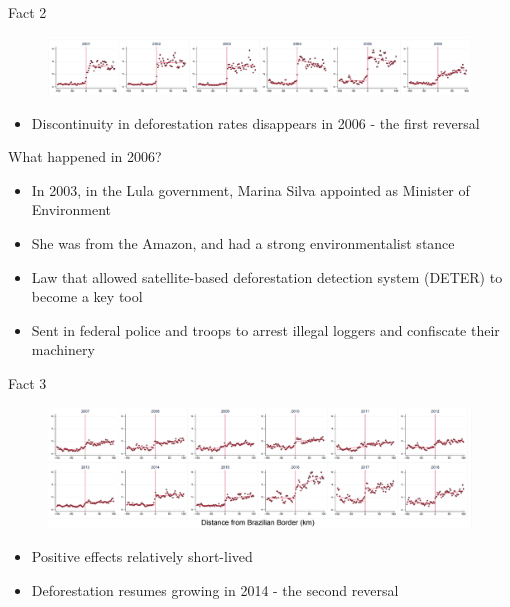 \documentclass[11pt,notes=hide,aspectratio=169,mathserif]{beamer}
\begin{document}
\begin{frame}{Fact 2}
\begin{figure}
\centering
\includegraphics[width=1\textwidth]{inputs/fig_2006.png}
\end{figure}
\begin{itemize}
\item Discontinuity in deforestation rates disappears in 2006 - the first reversal 
\end{itemize}
\end{frame}

\begin{frame}{What happened in 2006?}
\begin{itemize}
\item In 2003, in the Lula government, Marina Silva appointed as Minister of Environment
\item She was from the Amazon, and had a strong environmentalist stance
\item Law that allowed satellite-based deforestation detection system (DETER) to become a key tool
\item Sent in federal police and troops to arrest illegal loggers and confiscate their machinery
\end{itemize}
\end{frame}

\begin{frame}{Fact 3}
\begin{figure}
\centering
\includegraphics[width=1\textwidth]{inputs/fig_post.png}
\end{figure}
\begin{itemize}
\item Positive effects relatively short-lived 
\item Deforestation resumes growing in 2014 - the second reversal
\end{itemize}
\end{frame}
\end{document}
